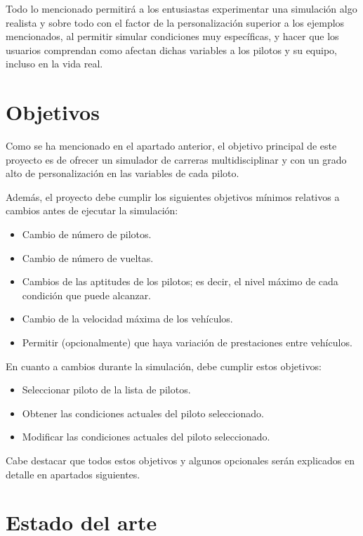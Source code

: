 \documentclass[a4paper,11pt]{book}
\begin{document}
\bigskip

Todo lo mencionado permitirá a los entusiastas experimentar una simulación algo realista y sobre todo con el factor de la personalización superior a los ejemplos mencionados, al permitir simular condiciones muy específicas, y hacer que los usuarios comprendan como afectan dichas variables a los pilotos y su equipo, incluso en la vida real.

\section{Objetivos}

Como se ha mencionado en el apartado anterior, el objetivo principal de este proyecto es de ofrecer un simulador de carreras multidisciplinar y con un grado alto de personalización en las variables de cada piloto.

\bigskip

Además, el proyecto debe cumplir los siguientes objetivos mínimos relativos a cambios antes de ejecutar la simulación:

\begin{itemize}
   \item Cambio de número de pilotos.
   \item Cambio de número de vueltas.
   \item Cambios de las aptitudes de los pilotos; es decir, el nivel máximo de cada condición que puede alcanzar.
   \item Cambio de la velocidad máxima de los vehículos.
   \item Permitir (opcionalmente) que haya variación de prestaciones entre vehículos.
\end{itemize}

\bigskip

En cuanto a cambios durante la simulación, debe cumplir estos objetivos:

\begin{itemize}
   \item Seleccionar piloto de la lista de pilotos.
   \item Obtener las condiciones actuales del piloto seleccionado.
   \item Modificar las condiciones actuales del piloto seleccionado.
\end{itemize}

Cabe destacar que todos estos objetivos y algunos opcionales serán explicados en detalle en apartados siguientes.

\section{Estado del arte}
\end{document}
